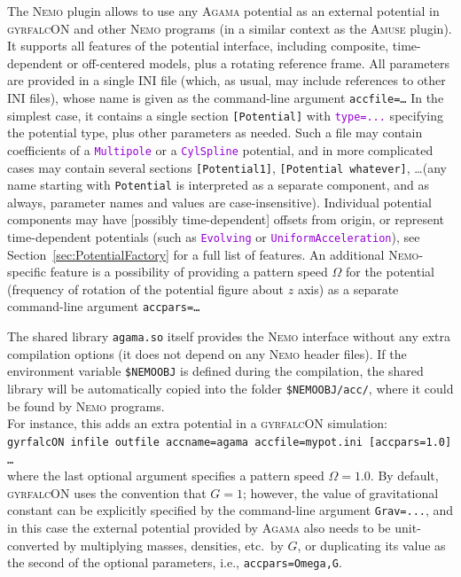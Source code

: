 \documentclass[12pt]{article}
\newcommand{\Agama}{\textsc{Agama}\xspace}
\newcommand{\Amuse}{\textsc{Amuse}\xspace}
\newcommand{\Nemo} {\textsc{Nemo}\xspace}
\newcommand{\ttt}[1]{\textcolor{darkviolet}{\texttt{#1}}}
\newcommand{\ppp}[1]{\textcolor{darkolive} {\texttt{#1}}}
\begin{document}
The \Nemo plugin allows to use any \Agama potential as an external potential in \textsc{gyrfalcON} and other \Nemo programs (in a similar context as the \Amuse plugin). It supports all features of the potential interface, including composite, time-dependent or off-centered models, plus a rotating reference frame. 
All parameters are provided in a single INI file (which, as usual, may include references to other INI files), whose name is given as the command-line argument \texttt{accfile=\dots} In the simplest case, it contains a single section \ppp{[Potential]} with \ttt{type=...} specifying the potential type, plus other parameters as needed. Such a file may contain coefficients of a \ttt{Multipole} or a \ttt{CylSpline} potential, and in more complicated cases may contain several sections  \ppp{[Potential1]}, \ppp{[Potential whatever]}, \dots (any name starting with \ppp{Potential} is interpreted as a separate component, and as always, parameter names and values are case-insensitive). Individual potential components may have [possibly time-dependent] offsets from origin, or represent time-dependent potentials (such as \ttt{Evolving} or \ttt{UniformAcceleration}), see Section~\ref{sec:PotentialFactory} for a full list of features. An additional \Nemo-specific feature is a possibility of providing a pattern speed $\Omega$ for the potential (frequency of rotation of the potential figure about $z$ axis) as a separate command-line argument \texttt{accpars=\dots}

The shared library \texttt{agama.so} itself provides the \Nemo interface without any extra compilation options (it does not depend on any \Nemo header files). If the environment variable \texttt{\$NEMOOBJ} is defined during the compilation, the shared library will be automatically copied into the folder \texttt{\$NEMOOBJ/acc/}, where it could be found by \Nemo programs.\\
For instance, this adds an extra potential in a \textsc{gyrfalcON}  simulation:\\[2mm]
\texttt{gyrfalcON infile outfile accname=agama accfile=mypot.ini [accpars=1.0] \dots}\\[2mm]
where the last optional argument specifies a pattern speed $\Omega=1.0$. By default, \textsc{gyrfalcON} uses the convention that $G=1$; however, the value of gravitational constant can be explicitly specified by the command-line argument \texttt{Grav=...}, and in this case the external potential provided by \Agama also needs to be unit-converted by multiplying masses, densities, etc.\ by $G$, or duplicating its value as the second of the optional parameters, i.e., \texttt{accpars=Omega,G}.
\end{document}
